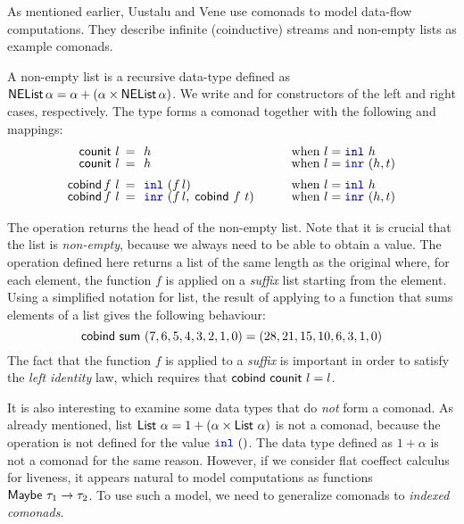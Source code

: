 As mentioned earlier, Uustalu and Vene \cite{comonads-notions} use comonads to model data-flow
computations. They describe infinite (coinductive) streams and non-empty lists as example comonads.

\begin{example}
A non-empty list is a recursive data-type defined as $\ident{NEList}\,\alpha = \alpha + (\alpha \times \ident{NEList}\,\alpha)$.
We write  and  for constructors of the left and right cases, respectively. The
type  forms a comonad together with the following  and  mappings:
%
\begin{equation*}
\begin{array}{rclll}
\ident{counit}~l &\narrow{=}& h &\quad&\textnormal{when}~l=\kvd{inl}~h\\[-0.25em]
\ident{counit}~l &\narrow{=}& h &&\textnormal{when}~l=\kvd{inr}~(h, t)\\[0.5em]
\ident{cobind}\,f~l &\narrow{=}& \kvd{inl}~(f\,l) &&\textnormal{when}~l=\kvd{inl}~h\\[-0.25em]
\ident{cobind}\,f~l &\narrow{=}& \kvd{inr}~(f\,l,\;\ident{cobind}~f~t) &&\textnormal{when}~l=\kvd{inr}~(h, t)
\end{array}
\end{equation*}
\end{example}

\noindent
The  operation returns the head of the non-empty list. Note that it is crucial that
the list is \emph{non-empty}, because we always need to be able to obtain a value. The 
operation defined here returns a list of the same length as the original where, for each element, the
function $f$ is applied on a \emph{suffix} list starting from the element. Using a simplified
notation for list, the result of applying  to a function that sums elements of a
list gives the following behaviour:
%
\begin{equation*}
\textnormal{\sffamily cobind}~\textnormal{\sffamily sum}~(7,6,5,4,3,2,1,0) = (28,21,15,10,6,3,1,0)
\end{equation*}
%
The fact that the function $f$ is applied to a \emph{suffix} is important in order to satisfy the
\emph{left identity} law, which requires that $\textnormal{\sffamily cobind}~\textnormal{\sffamily counit}~l = l$.

It is also interesting to examine some data types that do \emph{not} form a comonad. As already
mentioned, list $\ident{List}~\alpha = 1 + (\alpha \times \ident{List}~\alpha)$ is not a comonad,
because the  operation is not defined for the value $\kvd{inl}~()$. The 
data type defined as $1 + \alpha$ is not a comonad for the same reason. However, if we consider
flat coeffect calculus for liveness, it appears natural to model computations as functions
$\textnormal{\sffamily Maybe}~\tau_1 \rightarrow \tau_2$. To use such a model, we need to generalize comonads
to \emph{indexed comonads}.

